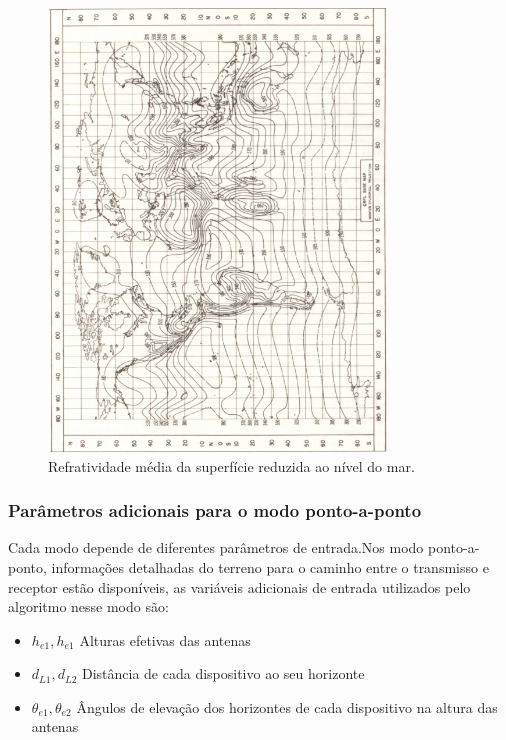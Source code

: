 \begin{figure}[nsmap]
\centering
\includegraphics[width=0.8\textwidth]{figs/nsmap}
\caption[Refratividade média da superfície reduzida ao nível do mar.]
{Refratividade média da superfície reduzida ao nível do mar.}
\label{fig:nsmap}
\end{figure}

\subsubsection{Parâmetros adicionais para o modo ponto-a-ponto}

Cada modo depende de diferentes parâmetros de entrada.Nos modo ponto-a-ponto, informações detalhadas do terreno para o caminho entre o transmisso e receptor estão disponíveis, as variáveis adicionais de entrada utilizados pelo algoritmo nesse modo são:

\begin{itemize}
\item \begin{math}h_{e1}, h_{e1}\end{math} Alturas efetivas das antenas
\item \begin{math}d_{L1},d_{L2}\end{math} Distância de cada dispositivo ao seu horizonte
\item \begin{math}\theta_{e1}, \theta_{e2}\end{math} Ângulos de elevação dos horizontes de cada dispositivo na altura das antenas
\end{itemize}

